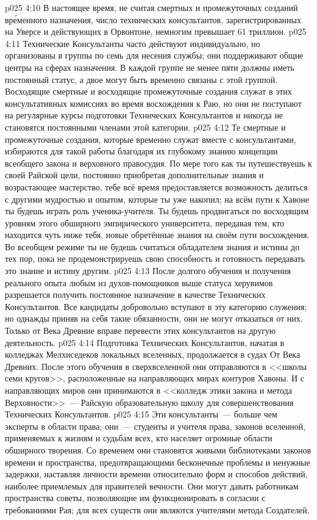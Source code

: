 \vs p025 4:10 \pc В настоящее время, не считая смертных и промежуточных созданий вр\'еменного назначения, число технических консультантов, зарегистрированных на Уверсе и действующих в Орвонтоне, немногим превышает 61 триллион.
\vs p025 4:11 Технические Консультанты часто действуют индивидуально, но организованы в группы по семь для несения службы; они поддерживают общие центры на сферах назначения. В каждой группе не менее пяти должны иметь постоянный статус, а двое могут быть временно связаны с этой группой. Восходящие смертные и восходящие промежуточные создания служат в этих консультативных комиссиях во время восхождения к Раю, но они не поступают на регулярные курсы подготовки Технических Консультантов и никогда не становятся постоянными членами этой категории.
\vs p025 4:12 Те смертные и промежуточные создания, которые временно служат вместе с консультантами, избираются для такой работы благодаря их глубокому знанию концепции всеобщего закона и верховного правосудия. По мере того как ты путешествуешь к своей Райской цели, постоянно приобретая дополнительные знания и возрастающее мастерство, тебе всё время предоставляется возможность делиться с другими мудростью и опытом, которые ты уже накопил; на всём пути к Хавоне ты будешь играть роль ученика\hyp{}учителя. Ты будешь продвигаться по восходящим уровням этого обширного эмпирического университета, передавая тем, кто находится чуть ниже тебя, новые обретённые знания на своём пути восхождения. Во всеобщем режиме ты не будешь считаться обладателем знания и истины до тех пор, пока не продемонстрируешь свою способность и готовность передавать это знание и истину другим.
\vs p025 4:13 После долгого обучения и получения реального опыта любым из духов\hyp{}помощников выше статуса херувимов разрешается получить постоянное назначение в качестве Технических Консультантов. Все кандидаты добровольно вступают в эту категорию служения; но однажды приняв на себя такие обязанности, они не могут отказаться от них. Только от Века Древние вправе перевести этих консультантов на другую деятельность.
\vs p025 4:14 \pc Подготовка Технических Консультантов, начатая в колледжах Мелхиседеков локальных вселенных, продолжается в судах От Века Древних. После этого обучения в сверхвселенной они отправляются в <<школы семи кругов>>, расположенные на направляющих мирах контуров Хавоны. И с направляющих миров они принимаются в <<колледж этики закона и метода Верховности>>~--- Райскую образовательную школу для совершенствования Технических Консультантов.
\vs p025 4:15 Эти консультанты~--- больше чем эксперты в области права; они~--- студенты и учителя  права, законов вселенной, применяемых к жизням и судьбам всех, кто населяет огромные области обширного творения. Со временем они становятся живыми библиотеками законов времени и пространства, предотвращающими бесконечные проблемы и ненужные задержки, наставляя личности времени относительно форм и способов действий, наиболее приемлемых для правителей вечности. Они могут давать работникам пространства советы, позволяющие им функционировать в согласии с требованиями Рая; для всех существ они являются учителями метода Создателей.
